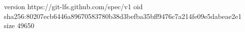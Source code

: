 version https://git-lfs.github.com/spec/v1
oid sha256:80207ecb6446a89670583780b38d3befba35bff9476c7a214fe09e5dabeae2e1
size 49650
